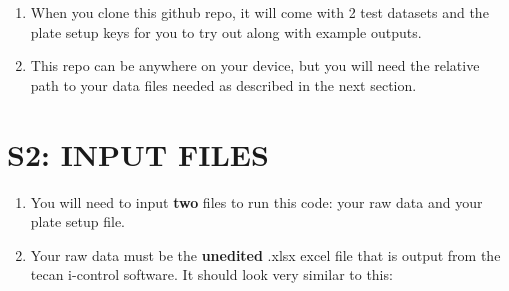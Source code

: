 \documentclass[12pt]{article}
\begin{document}
\begin{enumerate}
\item When you clone this github repo, it will come with 2 test datasets and the plate setup keys for you to try out along with example outputs.

\item This repo can be anywhere on your device, but you will need the relative path to your data files needed as described in the next section.
\end{enumerate}

\section*{S2: INPUT FILES}
\label{sec:org3703cb0}
\begin{enumerate}
\item You will need to input \textbf{two} files to run this code: your raw data
and your plate setup file.

\item Your raw data must be the \textbf{unedited} .xlsx excel file that is output
from the tecan i-control software. It should look very similar to
this:


\end{enumerate}
\end{document}
